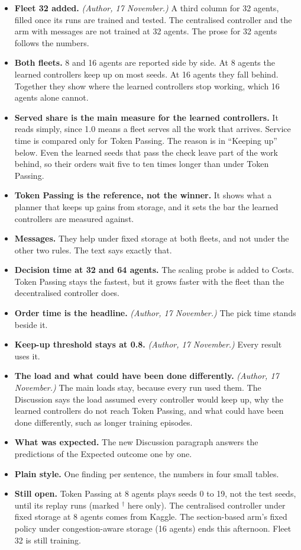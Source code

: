\documentclass[11pt,a4paper]{article}
\begin{document}
\begin{itemize}[leftmargin=1.2em]
\item \textbf{Fleet 32 added.} \emph{(Author, 17 November.)} A third column for 32 agents, filled once
  its runs are trained and tested. The centralised controller and the arm with messages are not
  trained at 32 agents. The prose for 32 agents follows the numbers.
\item \textbf{Both fleets.} 8 and 16 agents are reported side by side. At 8 agents the learned
  controllers keep up on most seeds. At 16 agents they fall behind. Together they show where the
  learned controllers stop working, which 16 agents alone cannot.
\item \textbf{Served share is the main measure for the learned controllers.} It reads simply, since
  1.0 means a fleet serves all the work that arrives. Service time is compared only for Token
  Passing. The reason is in ``Keeping up'' below. Even the learned seeds that pass the check leave
  part of the work behind, so their orders wait five to ten times longer than under Token Passing.
\item \textbf{Token Passing is the reference, not the winner.} It shows what a planner that keeps up
  gains from storage, and it sets the bar the learned controllers are measured against.
\item \textbf{Messages.} They help under fixed storage at both fleets, and not under the other two
  rules. The text says exactly that.
\item \textbf{Decision time at 32 and 64 agents.} The scaling probe is added to Costs. Token Passing
  stays the fastest, but it grows faster with the fleet than the decentralised controller does.
\item \textbf{Order time is the headline.} \emph{(Author, 17 November.)} The pick time stands beside it.
\item \textbf{Keep-up threshold stays at 0.8.} \emph{(Author, 17 November.)} Every result uses it.
\item \textbf{The load and what could have been done differently.} \emph{(Author, 17 November.)}
  The main loads stay, because every run used them. The Discussion says the load assumed every
  controller would keep up, why the learned controllers do not reach Token Passing, and what could
  have been done differently, such as longer training episodes.
\item \textbf{What was expected.} The new Discussion paragraph answers the predictions of the
  Expected outcome one by one.
\item \textbf{Plain style.} One finding per sentence, the numbers in four small tables.
\item \textbf{Still open.} Token Passing at 8 agents plays seeds 0 to 19, not the test seeds, until
  its replay runs (marked $^\dagger$ here only). The centralised controller under fixed storage at
  8 agents comes from Kaggle. The section-based arm's fixed policy under congestion-aware storage
  (16 agents) ends this afternoon. Fleet 32 is still training.
\end{itemize}
\end{document}
